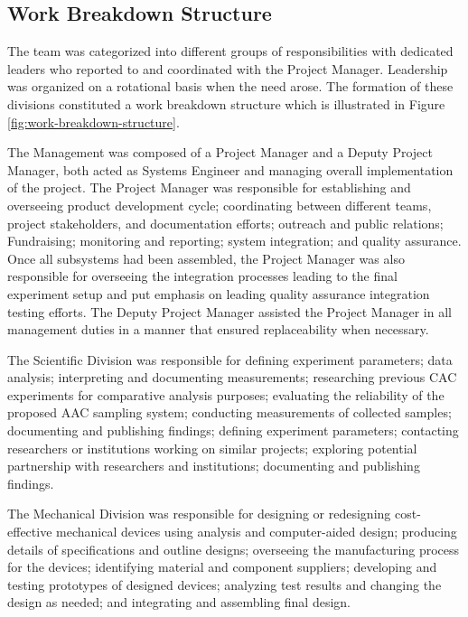 
\subsection{Work Breakdown Structure}

The team was categorized into different groups of responsibilities with dedicated leaders who reported to and coordinated with the Project Manager. Leadership was organized on a rotational basis when the need arose. The formation of these divisions constituted a work breakdown structure which is illustrated in Figure \ref{fig:work-breakdown-structure}.

The Management was composed of a Project Manager and a Deputy Project Manager, both acted as Systems Engineer and managing overall implementation of the project. The Project Manager was responsible for establishing and overseeing product development cycle; coordinating between different teams, project stakeholders, and documentation efforts; outreach and public relations; Fundraising; monitoring and reporting; system integration; and quality assurance. Once all subsystems had been assembled, the Project Manager was also responsible for overseeing the integration processes leading to the final experiment setup and put emphasis on leading quality assurance integration testing efforts. The Deputy Project Manager assisted the Project Manager in all management duties in a manner that ensured replaceability when necessary.

The Scientific Division was responsible for defining experiment parameters; data analysis; interpreting and documenting measurements; researching previous CAC experiments for comparative analysis purposes; evaluating the reliability of the proposed AAC sampling system; conducting measurements of collected samples; documenting and publishing findings; defining experiment parameters; contacting researchers or institutions working on similar projects; exploring potential partnership with researchers and institutions; documenting and publishing findings.

The Mechanical Division was responsible for designing or redesigning cost-effective mechanical devices using analysis and computer-aided design; producing details of specifications and outline designs; overseeing the manufacturing process for the devices; identifying material and component suppliers; developing and testing prototypes of designed devices; analyzing test results and changing the design as needed; and integrating and assembling final design.

